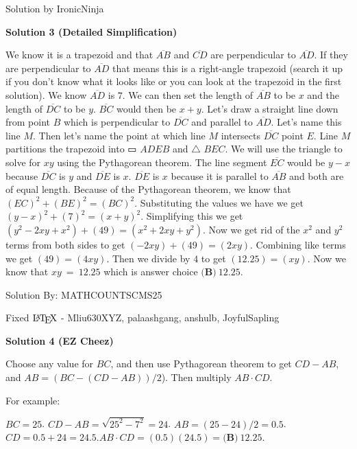 \begin{enumerate}
 Solution by IronicNinja

 



\textbf{Solution 3 (Detailed Simplification)}

We know it is a trapezoid and that $\overline{AB}$ and $\overline{CD}$ are perpendicular to $\overline{AD}$. If they are perpendicular to $\overline{AD}$ that means this is a right-angle trapezoid (search it up if you don't know what it looks like or you can look at the trapezoid in the first solution). We know $\overline{AD}$ is $7$. We can then set the length of $\overline{AB}$ to be $x$ and the length of $\overline{DC}$ to be $y$. $\overline{BC}$ would then be $x+y$. Let's draw a straight line down from point $B$ which is perpendicular to $\overline{DC}$ and parallel to $\overline{AD}$. Let's name this line $M$. Then let's name the point at which line $M$ intersects $\overline{DC}$ point $E$. Line $M$ partitions the trapezoid into ▭ $ADEB$ and $\triangle$ $BEC$. We will use the triangle to solve for $xy$ using the Pythagorean theorem. The line segment $\overline{EC}$ would be $y-x$ because $\overline{DC}$ is $y$ and $\overline{DE}$ is $x$. $\overline{DE}$ is $x$ because it is parallel to $\overline{AB}$ and both are of equal length. Because of the Pythagorean theorem, we know that $(EC)^2+(BE)^2=(BC)^2$. Substituting the values we have we get $(y-x)^2+(7)^2=(x+y)^2$. Simplifying this we get $(y^2-2xy+x^2)+(49)=(x^2+2xy+y^2)$. Now we get rid of the $x^2$ and $y^2$ terms from both sides to get $(-2xy)+(49)=(2xy)$. Combining like terms we get $(49)=(4xy)$. Then we divide by $4$ to get $(12.25)=(xy)$. Now we know that $xy\ =\ 12.25$ which is answer choice $\boxed{\textbf{(B)}\ 12.25}$.

 Solution By: MATHCOUNTSCMS25

 Fixed $\text{\LaTeX}$ - Mliu630XYZ, palaashgang, anshulb, JoyfulSapling

 



\textbf{Solution 4 (EZ Cheez)}

Choose any value for $BC$, and then use Pythagorean theorem to get $CD - AB$, and $AB = (BC - (CD - AB))/2$). Then multiply $AB \cdot CD$. 

 For example: 

 $BC=25$. $CD - AB = \sqrt{25^2 - 7^2} = 24$. $AB = (25 - 24)/2=0.5$. $CD = 0.5 + 24 = 24.5$.$AB \cdot CD = (0.5)(24.5)= \boxed{\textbf{(B)}\ 12.25}$.

 




\end{enumerate}
